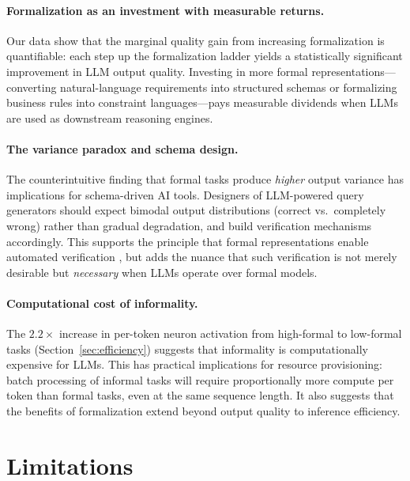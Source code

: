 \documentclass[runningheads]{llncs}
\begin{document}
\paragraph{Formalization as an investment with measurable returns.}
Our data show that the marginal quality gain from increasing formalization is quantifiable: each step up the formalization ladder yields a statistically significant improvement in LLM output quality. Investing in more formal representations---converting natural-language requirements into structured schemas or formalizing business rules into constraint languages---pays measurable dividends when LLMs are used as downstream reasoning engines.

\paragraph{The variance paradox and schema design.}
The counterintuitive finding that formal tasks produce \emph{higher} output variance has implications for schema-driven AI tools. Designers of LLM-powered query generators should expect bimodal output distributions (correct vs.\ completely wrong) rather than gradual degradation, and build verification mechanisms accordingly. This supports the principle that formal representations enable automated verification \cite{wand1990ontological}, but adds the nuance that such verification is not merely desirable but \emph{necessary} when LLMs operate over formal models.

\paragraph{Computational cost of informality.}
The $2.2\times$ increase in per-token neuron activation from high-formal to low-formal tasks (Section~\ref{sec:efficiency}) suggests that informality is computationally expensive for LLMs. This has practical implications for resource provisioning: batch processing of informal tasks will require proportionally more compute per token than formal tasks, even at the same sequence length. It also suggests that the benefits of formalization extend beyond output quality to inference efficiency.

\section{Limitations}
\label{sec:limitations}
\end{document}
